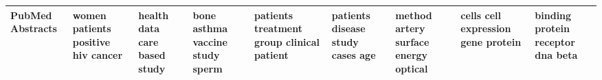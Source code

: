 \documentclass[11pt,a4paper]{article}
\begin{document}
\begin{appendices}
\begin{table}[htb]
\begin{tiny}
\begin{tabular}{|p{}|p{}|p{}|p{}|p{}|p{}|p{}|p{}|p{}|}
    PubMed Abstracts & women \newline patients \newline positive \newline hiv \newline cancer & health \newline data \newline care \newline based \newline study & bone \newline asthma \newline vaccine \newline study \newline sperm & patients \newline treatment \newline group \newline clinical \newline patient & patients \newline disease \newline study \newline cases \newline age & method \newline artery \newline surface \newline energy \newline optical & cells \newline cell \newline expression \newline gene \newline protein & binding \newline protein \newline receptor \newline dna \newline beta\\\hline

\end{tabular}
\end{tiny}
\end{table}
\end{appendices}
\end{document}
